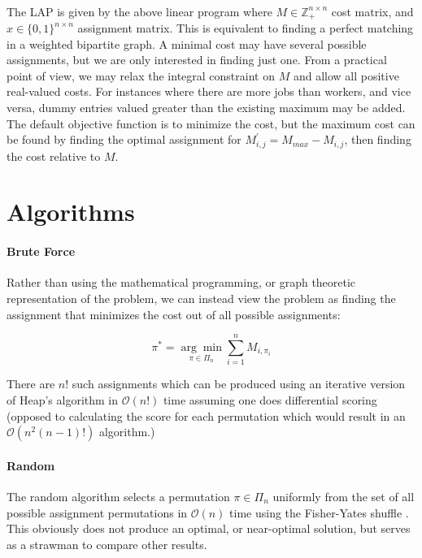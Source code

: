 \documentclass{article}
\newcommand{\boundedBy}[1]{\mathcal{O} \left ( #1 \right )}
\begin{document}
\paragraph{} The LAP is given by the above linear program where $M \in \mathbb{Z}_{+}^{n \times n}$ cost matrix, and $x \in \lbrace 0,1 \rbrace^{n \times n}$ assignment matrix. This is equivalent to finding a perfect matching in a weighted bipartite graph. A minimal cost may have several possible assignments, but we are only interested in finding just one. From a practical point of view, we may relax the integral constraint on $M$ and allow all positive real-valued costs. For instances where there are more jobs than workers, and vice versa, dummy entries valued greater than the existing maximum may be added. The default objective function is to minimize the cost, but the maximum cost can be found by finding the optimal assignment for $M^{\prime}_{i,j} = M_{max} - M_{i,j}$, then finding the cost relative to $M$. 

\section{Algorithms}

\paragraph{Brute Force}

Rather than using the mathematical programming, or graph theoretic representation of the problem, we can instead view the problem as finding the assignment that minimizes the cost out of all possible assignments:

\begin{equation}
	\pi^{*} = \underset{\pi \in \Pi_n}{\arg\min} \sum_{i=1}^{n} M_{i, \pi_i}
\end{equation}

There are $n!$ such assignments which can be produced using an iterative version of Heap's algorithm \cite{heap1963permutations} in $\boundedBy{n!}$ time assuming one does differential scoring (opposed to calculating the score for each permutation which would result in an $\boundedBy{n^2 (n-1)!}$ algorithm.)

\paragraph{Random}

The random algorithm selects a permutation $\pi \in \Pi_n$ uniformly from the set of all possible assignment permutations in $\boundedBy{n}$ time using the Fisher-Yates shuffle \cite{durstenfeld1964algorithm}. This obviously does not produce an optimal, or near-optimal solution, but serves as a strawman to compare other results.
\end{document}
